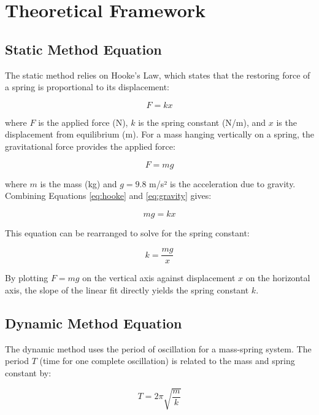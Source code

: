 \documentclass[12pt]{article}
\begin{document}
\section*{Theoretical Framework}

\subsection*{Static Method Equation}

The static method relies on Hooke's Law, which states that the restoring force of a spring is proportional to its displacement:

\begin{equation}
F = kx
\label{eq:hooke}
\end{equation}

where $F$ is the applied force (N), $k$ is the spring constant (N/m), and $x$ is the displacement from equilibrium (m). For a mass hanging vertically on a spring, the gravitational force provides the applied force:

\begin{equation}
F = mg
\label{eq:gravity}
\end{equation}

where $m$ is the mass (kg) and $g = 9.8$ m/s² is the acceleration due to gravity. Combining Equations \ref{eq:hooke} and \ref{eq:gravity} gives:

\begin{equation}
mg = kx
\label{eq:static}
\end{equation}

This equation can be rearranged to solve for the spring constant:

\begin{equation}
k = \frac{mg}{x}
\label{eq:k_static}
\end{equation}

By plotting $F = mg$ on the vertical axis against displacement $x$ on the horizontal axis, the slope of the linear fit directly yields the spring constant $k$.

\subsection*{Dynamic Method Equation}

The dynamic method uses the period of oscillation for a mass-spring system. The period $T$ (time for one complete oscillation) is related to the mass and spring constant by:

\begin{equation}
T = 2\pi\sqrt{\frac{m}{k}}
\label{eq:period}
\end{equation}
\end{document}

